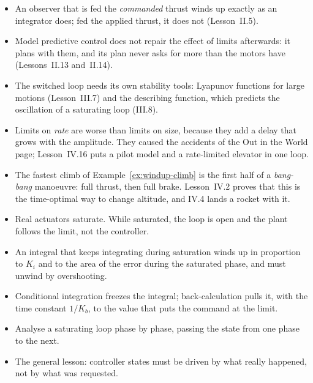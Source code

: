 \begin{lookahead}
\begin{itemize}[leftmargin=1.2em]
  \item An observer that is fed the \emph{commanded} thrust winds up exactly as an integrator does; fed the applied thrust, it does not (Lesson~II.5).
  \item Model predictive control does not repair the effect of limits afterwards: it plans with them, and its plan never asks for more than the motors have (Lessons~II.13 and~II.14).
  \item The switched loop needs its own stability tools: Lyapunov functions for large motions (Lesson~III.7) and the describing function, which predicts the oscillation of a saturating loop (III.8).
  \item Limits on \emph{rate} are worse than limits on size, because they add a delay that grows with the amplitude. They caused the accidents of the Out in the World page; Lesson~IV.16 puts a pilot model and a rate-limited elevator in one loop.
  \item The fastest climb of Example~\ref{ex:windup-climb} is the first half of a \emph{bang-bang} manoeuvre: full thrust, then full brake. Lesson~IV.2 proves that this is the time-optimal way to change altitude, and IV.4 lands a rocket with it.
\end{itemize}
\end{lookahead}

\begin{remember}
\begin{itemize}
  \item Real actuators saturate. While saturated, the loop is open and the plant follows the limit, not the controller.
  \item An integral that keeps integrating during saturation winds up in proportion to $K_i$ and to the area of the error during the saturated phase, and must unwind by overshooting.
  \item Conditional integration freezes the integral; back-calculation pulls it, with the time constant $1/K_b$, to the value that puts the command at the limit.
  \item Analyse a saturating loop phase by phase, passing the state from one phase to the next.
  \item The general lesson: controller states must be driven by what really happened, not by what was requested.
\end{itemize}
\end{remember}

